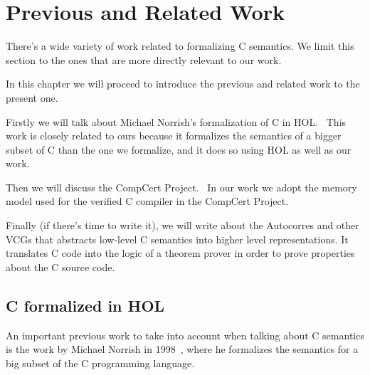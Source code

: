 \chapter{Previous and Related Work}\label{chapter:previous}

There's a wide variety of work related to formalizing C semantics.
We limit this section to the ones that are more directly relevant to our work.

In this chapter we will proceed to introduce the previous and related work to the present one.

Firstly we will talk about Michael Norrish's formalization of C in HOL.~\parencite{norrish}
This work is closely related to ours because it formalizes the semantics of a bigger subset of C than the one we formalize, and it does so using HOL as well as our work.

Then we will discuss the CompCert Project.~\parencite{compcert}
In our work we adopt the memory model used for the verified C compiler in the CompCert Project.

Finally (if there's time to write it), we will write about the Autocorres and other VCGs that abstracts low-level C semantics into higher level representations.
It translates C code into the logic of a theorem prover in order to prove properties about the C source code.

\section{C formalized in HOL}

An important previous work to take into account when talking about C semantics is the work by Michael Norrish in 1998~\parencite{norrish}, where he formalizes the semantics for a big subset of the C programming language.

